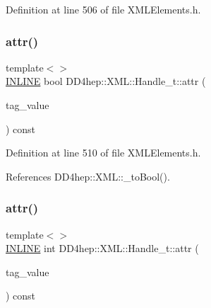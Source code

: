 Definition at line 506 of file X\+M\+L\+Elements.\+h.

\hypertarget{class_d_d4hep_1_1_x_m_l_1_1_handle__t_ab04c2ba0c378025889ee6d0fe35d88bb}{}\label{class_d_d4hep_1_1_x_m_l_1_1_handle__t_ab04c2ba0c378025889ee6d0fe35d88bb} 
\subsubsection{\texorpdfstring{attr()}{attr()}\hspace{0.1cm}{\footnotesize\ttfamily [6/10]}}
{\footnotesize\ttfamily template$<$$>$ \\
\hyperlink{_x_m_l_elements_8h_a2eb6f9e0395b47b8d5e3eeae4fe0c116}{I\+N\+L\+I\+NE} bool D\+D4hep\+::\+X\+M\+L\+::\+Handle\+\_\+t\+::attr (\begin{DoxyParamCaption}\item[{const \hyperlink{namespace_d_d4hep_1_1_x_m_l_a09e5d9cc86ed782f6826dfe0778c1815}{Xml\+Char} $\ast$}]{tag\+\_\+value }\end{DoxyParamCaption}) const}



Definition at line 510 of file X\+M\+L\+Elements.\+h.



References D\+D4hep\+::\+X\+M\+L\+::\+\_\+to\+Bool().

\hypertarget{class_d_d4hep_1_1_x_m_l_1_1_handle__t_a1a986a491af5d828c50fba7c6dc9f10e}{}\label{class_d_d4hep_1_1_x_m_l_1_1_handle__t_a1a986a491af5d828c50fba7c6dc9f10e} 
\subsubsection{\texorpdfstring{attr()}{attr()}\hspace{0.1cm}{\footnotesize\ttfamily [7/10]}}
{\footnotesize\ttfamily template$<$$>$ \\
\hyperlink{_x_m_l_elements_8h_a2eb6f9e0395b47b8d5e3eeae4fe0c116}{I\+N\+L\+I\+NE} int D\+D4hep\+::\+X\+M\+L\+::\+Handle\+\_\+t\+::attr (\begin{DoxyParamCaption}\item[{const \hyperlink{namespace_d_d4hep_1_1_x_m_l_a09e5d9cc86ed782f6826dfe0778c1815}{Xml\+Char} $\ast$}]{tag\+\_\+value }\end{DoxyParamCaption}) const}



